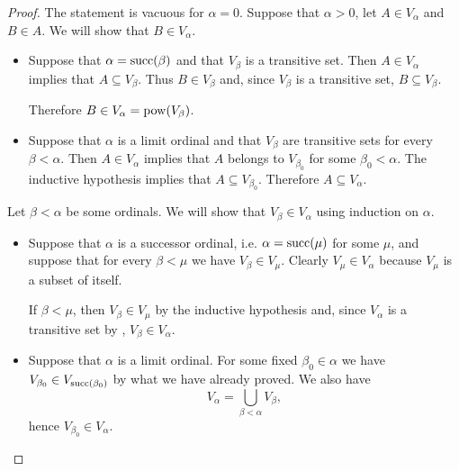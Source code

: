 \begin{proof}
   The statement is vacuous for \( \alpha = 0 \). Suppose that \( \alpha > 0 \), let \( A \in V_\alpha \) and \( B \in A \). We will show that \( B \in V_\alpha \).
  \begin{itemize}
    \item Suppose that \( \alpha = \operatorname{succ}(\beta) \) and that \( V_\beta \) is a transitive set. Then \( A \in V_\alpha \) implies that \( A \subseteq V_\beta \). Thus \( B \in V_\beta \) and, since \( V_\beta \) is a transitive set, \( B \subseteq V_\beta \).

    Therefore \( B \in V_\alpha = \operatorname{pow}(V_\beta) \).

    \item Suppose that \( \alpha \) is a limit ordinal and that \( V_\beta \) are transitive sets for every \( \beta < \alpha \). Then \( A \in V_\alpha \) implies that \( A \) belongs to \( V_{\beta_0} \) for some \( \beta_0 < \alpha \). The inductive hypothesis implies that \( A \subseteq V_{\beta_0} \). Therefore \( A \subseteq V_\alpha \).
  \end{itemize}

   Let \( \beta < \alpha \) be some ordinals. We will show that \( V_\beta \in V_\alpha \) using induction on \( \alpha \).
  \begin{itemize}
    \item Suppose that \( \alpha \) is a successor ordinal, i.e. \( \alpha = \operatorname{succ}(\mu) \) for some \( \mu \), and suppose that for every \( \beta < \mu \) we have \( V_\beta \in V_\mu \). Clearly \( V_\mu \in V_\alpha \) because \( V_\mu \) is a subset of itself.

    If \( \beta < \mu \), then \( V_\beta \in V_\mu \) by the inductive hypothesis and, since \( V_\alpha \) is a transitive set by , \( V_\beta \in V_\alpha \).

    \item Suppose that \( \alpha \) is a limit ordinal. For some fixed \( \beta_0 \in \alpha \) we have \( V_{\beta_0} \in V_{\operatorname{succ}(\beta_0)} \) by what we have already proved. We also have
    \begin{equation*}
      V_\alpha
      =
      \bigcup_{\beta < \alpha} V_\beta,
    \end{equation*}
    hence \( V_{\beta_0} \in V_\alpha \).
  \end{itemize}


\end{proof}
